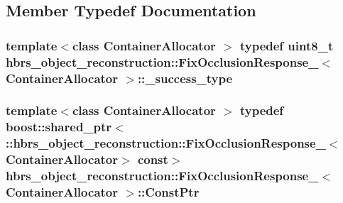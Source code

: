 \subsection{\-Member \-Typedef \-Documentation}
\hypertarget{structhbrs__object__reconstruction_1_1_fix_occlusion_response___ac3adc7cebc9c1913ef0b8ca295e93e7e}{
\subsubsection[{\-\_\-success\-\_\-type}]{\setlength{\rightskip}{0pt plus 5cm}template$<$class Container\-Allocator $>$ typedef uint8\-\_\-t {\bf hbrs\-\_\-object\-\_\-reconstruction\-::\-Fix\-Occlusion\-Response\-\_\-}$<$ \-Container\-Allocator $>$\-::{\bf \-\_\-success\-\_\-type}}}\label{structhbrs__object__reconstruction_1_1_fix_occlusion_response___ac3adc7cebc9c1913ef0b8ca295e93e7e}
\hypertarget{structhbrs__object__reconstruction_1_1_fix_occlusion_response___a6446934e37dce2b75e4cf2a64631631c}{
\subsubsection[{\-Const\-Ptr}]{\setlength{\rightskip}{0pt plus 5cm}template$<$class Container\-Allocator $>$ typedef boost\-::shared\-\_\-ptr$<$ \-::{\bf hbrs\-\_\-object\-\_\-reconstruction\-::\-Fix\-Occlusion\-Response\-\_\-}$<$\-Container\-Allocator$>$ const$>$ {\bf hbrs\-\_\-object\-\_\-reconstruction\-::\-Fix\-Occlusion\-Response\-\_\-}$<$ \-Container\-Allocator $>$\-::{\bf \-Const\-Ptr}}}\label{structhbrs__object__reconstruction_1_1_fix_occlusion_response___a6446934e37dce2b75e4cf2a64631631c}
